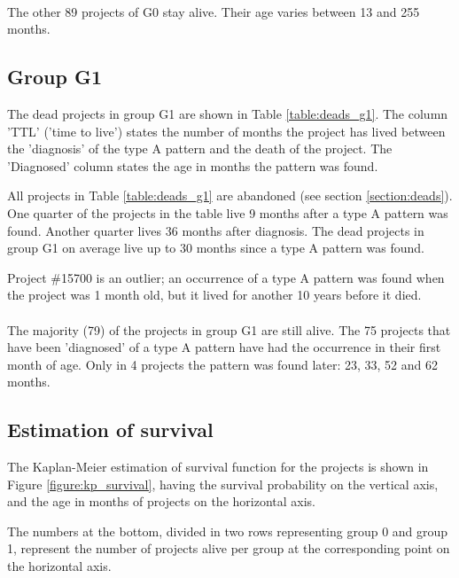 \paragraph{}
The other 89 projects of G0 stay alive. Their age varies between 13 and 255
months.

\subsection{Group G1}
\label{section:group_g1}
The dead projects in group G1 are shown in Table \ref{table:deads_g1}. The
column 'TTL' ('time to live') states the number of months the project has
lived between the 'diagnosis' of the type A pattern and the death of the
project. The 'Diagnosed' column states the age in months the pattern was found.



\noindent
All projects in Table \ref{table:deads_g1} are abandoned (see section
\ref{section:deads}). One quarter of the projects in the table live 9 months
after a type A pattern was found. Another quarter lives 36 months after
diagnosis. The dead projects in group G1 on average live up to 30 months since
a type A pattern was found.

Project \#15700 is an outlier; an occurrence of a type A pattern was found when
the project was 1 month old, but it lived for another 10 years before it died.

\paragraph{}
The majority (79) of the projects in group G1 are still alive. The 75 projects
that have been 'diagnosed' of a type A pattern have had the occurrence in their
first month of age. Only in 4 projects the pattern was found later: 23, 33, 52
and 62 months.

\subsection{Estimation of survival}
The Kaplan-Meier estimation of survival function for the projects is shown in
Figure \ref{figure:kp_survival}, having the survival probability on the
vertical axis, and the age in months of projects on the horizontal axis.

The numbers at the bottom, divided in two rows representing group 0 and group
1, represent the number of projects alive per group at the corresponding point
on the horizontal axis.

